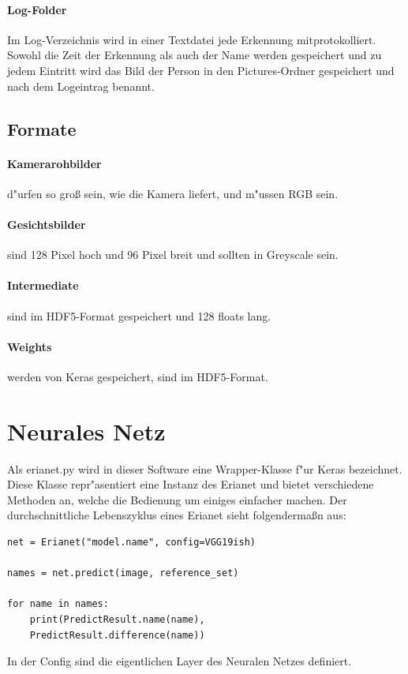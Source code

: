 \documentclass[12pt]{article}
\begin{document}
\paragraph{Log-Folder}
Im Log-Verzeichnis wird in einer Textdatei jede Erkennung mitprotokolliert.
Sowohl die Zeit der Erkennung als auch der Name werden gespeichert und zu
jedem Eintritt wird das Bild der Person in den Pictures-Ordner gespeichert
und nach dem Logeintrag benannt.
\subsection{Formate}
\paragraph{Kamerarohbilder}
d"urfen so gro{\ss} sein, wie die Kamera liefert, und m"ussen RGB sein.
\paragraph{Gesichtsbilder}
sind 128 Pixel hoch und 96 Pixel breit und sollten in Greyscale 
sein.
\paragraph{Intermediate}
sind im HDF5-Format gespeichert und 128 floats lang.
\paragraph{Weights}
werden von Keras gespeichert, sind im HDF5-Format. 
\label{formats}

\pagebreak
\section{Neurales Netz}
Als erianet.py wird in dieser Software eine Wrapper-Klasse f"ur 
Keras bezeichnet. Diese Klasse repr"asentiert eine Instanz des 
Erianet und bietet verschiedene Methoden an, welche die 
Bedienung um einiges einfacher machen. Der durchschnittliche
Lebenszyklus eines Erianet sieht folgenderma{\ss}n aus:
\begin{lstlisting}[frame=single]
net = Erianet("model.name", config=VGG19ish)

names = net.predict(image, reference_set)

for name in names:
    print(PredictResult.name(name), 
    PredictResult.difference(name))
\end{lstlisting}
In der Config sind die eigentlichen Layer des Neuralen Netzes definiert.
\end{document}
